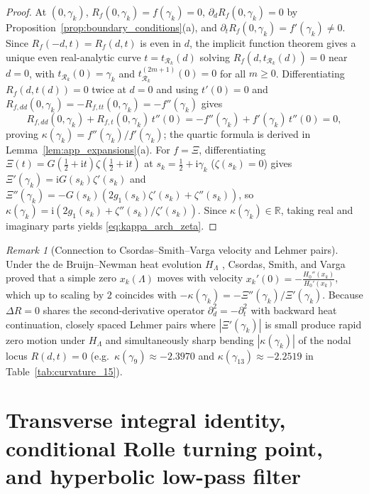 \documentclass[11pt,a4paper,reqno]{amsart}
\theoremstyle{definition}
\theoremstyle{remark}
\newtheorem{remark}[theorem]{Remark}
\numberwithin{equation}{section}
\newcommand{\ii}{\mathrm{i}}
\begin{document}
\begin{proof}
At $(0, \gamma_k)$, $R_f(0,\gamma_k) = f(\gamma_k) = 0$, $\partial_d R_f(0,\gamma_k) = 0$ by Proposition~\ref{prop:boundary_conditions}(a), and $\partial_t R_f(0,\gamma_k) = f'(\gamma_k) \neq 0$. Since $R_f(-d,t) = R_f(d,t)$ is even in $d$, the implicit function theorem gives a unique even real-analytic curve $t = t_{\mathcal{R}_k}(d)$ solving $R_f(d, t_{\mathcal{R}_k}(d)) = 0$ near $d = 0$, with $t_{\mathcal{R}_k}(0) = \gamma_k$ and $t_{\mathcal{R}_k}^{(2m+1)}(0) = 0$ for all $m \ge 0$. Differentiating $R_f(d, t(d)) = 0$ twice at $d = 0$ and using $t'(0) = 0$ and $R_{f,dd}(0,\gamma_k) = -R_{f,tt}(0,\gamma_k) = -f''(\gamma_k)$ gives
\[
R_{f,dd}(0,\gamma_k) + R_{f,t}(0,\gamma_k)\,t''(0) = -f''(\gamma_k) + f'(\gamma_k)\,t''(0) = 0,
\]
proving $\kappa(\gamma_k) = f''(\gamma_k)/f'(\gamma_k)$; the quartic formula is derived in Lemma~\ref{lem:app_expansions}(a). For $f = \Xi$, differentiating $\Xi(t) = G(\frac{1}{2}+\ii t)\zeta(\frac{1}{2}+\ii t)$ at $s_k = \frac{1}{2}+\ii\gamma_k$ ($\zeta(s_k) = 0$) gives $\Xi'(\gamma_k) = \ii G(s_k)\zeta'(s_k)$ and $\Xi''(\gamma_k) = -G(s_k)(2g_1(s_k)\zeta'(s_k) + \zeta''(s_k))$, so $\kappa(\gamma_k) = \ii(2g_1(s_k) + \zeta''(s_k)/\zeta'(s_k))$. Since $\kappa(\gamma_k) \in \mathbb{R}$, taking real and imaginary parts yields \eqref{eq:kappa_arch_zeta}.
\end{proof}

\begin{remark}[Connection to Csordas--Smith--Varga velocity and Lehmer pairs]\label{rem:lehmer_curvature}
Under the de Bruijn--Newman heat evolution $H_\Lambda$ \cite{DeBruijn1950,Newman1976,RodgersTao2020}, Csordas, Smith, and Varga \cite[Equation~(2.8)]{CsordasSmithVarga1994} proved that a simple zero $x_k(\Lambda)$ moves with velocity $x_k'(0) = -\frac{H_0''(x_k)}{H_0'(x_k)}$, which up to scaling by $2$ coincides with $-\kappa(\gamma_k) = -\Xi''(\gamma_k)/\Xi'(\gamma_k)$. Because $\Delta R = 0$ shares the second-derivative operator $\partial_d^2 = -\partial_t^2$ with backward heat continuation, closely spaced Lehmer pairs \cite{Lehmer1956} where $|\Xi'(\gamma_k)|$ is small produce rapid zero motion under $H_\Lambda$ and simultaneously sharp bending $|\kappa(\gamma_k)|$ of the nodal locus $R(d,t) = 0$ (e.g.\ $\kappa(\gamma_9) \approx -2.3970$ and $\kappa(\gamma_{13}) \approx -2.2519$ in Table~\ref{tab:curvature_15}).
\end{remark}

\section{Transverse integral identity, conditional Rolle turning point, and hyperbolic low-pass filter}\label{sec:integral_law}
\end{document}
